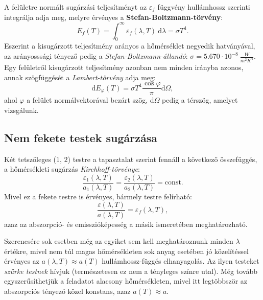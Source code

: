 \documentclass[a4paper, 12pt]{article}
\begin{document}
    A felületre normált sugárzási teljesítményt az $\varepsilon_f$ függvény hullámhossz szerinti integrálja adja meg, melyre érvényes a \textbf{Stefan-Boltzmann-törvény}:
    \begin{equation}
        E_f(T)=\int_{0}^{\infty} \varepsilon_f(\lambda, T)~\mathrm{d}\lambda=\sigma T^4.
    \end{equation}
    Eszerint a kisugárzott teljesítmény arányos a hőmérséklet negyedik hatványával, az arányosssági tényező pedig a \textit{Stefan-Boltzmann-állandó}: $\sigma=5.670\cdot10^{-8}~\frac{W}{m^2K^4}$.
    Egy felületről kisugárzott teljesítmény azonban nem minden irányba azonos, annak szögfüggését a \textit{Lambert-törvény} adja meg:
    \begin{equation}
        \mathrm{d}E_\varphi(T)=\sigma T^4\frac{\cos\varphi}{\pi}\mathrm{d}\Omega,
    \end{equation}
    ahol $\varphi$ a felület normálvektorával bezárt szög, $\mathrm{d}\Omega$ pedig a térszög, amelyet vizsgálunk.

    \subsection{Nem fekete testek sugárzása}
    Két tetszőleges ($1$, $2$) testre a tapasztalat szerint fennáll a következő összefüggés, a hőmérsékleti sugárzás \textit{Kirchhoff-törvénye}:
    \begin{equation}
        \frac{\varepsilon_1(\lambda, T)}{a_1(\lambda, T)}=\frac{\varepsilon_2(\lambda, T)}{a_2(\lambda, T)}=\mathrm{const}.
    \end{equation}
    Mivel ez a fekete testre is érvényes, bármely testre felírható:
    \begin{equation}
        \frac{\varepsilon(\lambda, T)}{a(\lambda, T)}=\varepsilon_f(\lambda, T),
    \end{equation}
    azaz az abszorpció- és emisszióképesség a másik ismeretében meghatározható.

    Szerencsére sok esetben még az egyiket sem kell meghatároznunk minden $\lambda$ értékre, mivel nem túl magas hőmérsékleten sok anyag esetében jó közelítéssel érvényes az $a(\lambda, T)\approx a(T)$ hullámhossz-függés elhanyagolás.
    Az ilyen testeket \textit{szürke testnek} hívjuk (természetesen ez nem a tényleges színre utal).
    Még tovább egyszerűsíthetjük a feladatot alacsony hőmérsékleten, mivel itt legtöbbször az abszorpciós tényező közel konstans, azaz $a(T)\approx a$.
\end{document}
